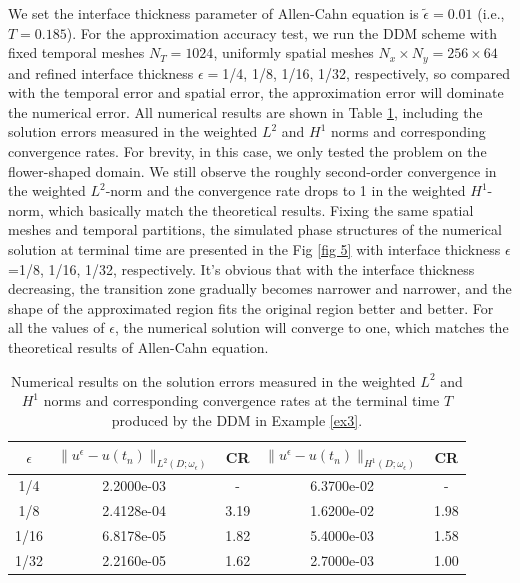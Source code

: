 \documentclass[3p,times]{elsarticle}
\numberwithin{equation}{section}
\begin{document}
We set the interface thickness parameter of Allen-Cahn equation is $\widetilde{\epsilon}=0.01$ (i.e., $T=0.185$). For the approximation accuracy test, we run the DDM scheme with fixed temporal meshes $N_T=1024$, uniformly spatial meshes $N_x\times N_y=256\times 64$ and refined interface thickness $\epsilon=$1/4, 1/8, 1/16, 1/32, respectively, so compared with the temporal error and spatial error, the approximation error will dominate the numerical error. All numerical results are shown in Table \ref{tab 3}, including the solution errors measured in the weighted $L^2$ and $H^1$ norms and corresponding convergence rates. For brevity, in this case, we only tested the problem on the flower-shaped domain. We still observe the roughly second-order convergence in the weighted $L^2$-norm and the convergence rate drops to 1 in the weighted $H^1$-norm, which basically match the theoretical results. Fixing the same spatial meshes and temporal partitions, the simulated phase structures of the numerical solution at terminal time are presented in the Fig \ref{fig 5} with interface thickness $\epsilon$=1/8, 1/16, 1/32, respectively. It's obvious that with the interface thickness decreasing, the transition zone gradually becomes narrower and narrower, and the shape of the approximated region fits the original region better and better. For all the values of $\epsilon$, the numerical solution will converge to one, which matches the theoretical results of Allen-Cahn equation.
\begin{table}[htbp]
	\centering
	\caption{Numerical results on the solution errors measured in the weighted $L^2$ and $H^1$ norms and corresponding convergence rates at the terminal time $T$ produced by the DDM in Example \ref{ex3}.}
	\begin{tabular}{|ccccc|}
		\hline
		$\epsilon$ & $\|u^{\epsilon}-u(t_n)\|_{L^2(D;\omega_{\epsilon})}$ & CR & $\|u^{\epsilon}-u(t_n)\|_{H^1(D;\omega_{\epsilon})}$ & CR\\
		\hline
		1/4 & 2.2000e-03 & - & 6.3700e-02 & -\\
		1/8 & 2.4128e-04 & 3.19 & 1.6200e-02 & 1.98 \\
		1/16 & 6.8178e-05 & 1.82 & 5.4000e-03 & 1.58 \\
		1/32 & 2.2160e-05 & 1.62 & 2.7000e-03 & 1.00 \\
		\hline
	\end{tabular}
	\label{tab 3}
\end{table}
\end{document}
